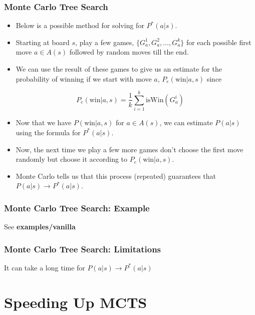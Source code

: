 \documentclass{beamer}
\begin{document}
\begin{frame}
  \frametitle{Monte Carlo Tree Search}
  \begin{itemize}
  \item Below is a possible method for solving for $P^*(a | s)$.
    \pause
  \item Starting at board $s$, play a few games, $\{G_a^1, G_a^2, \dots, G_a^k\}$ for each possible first move $a \in A(s)$ followed by random moves till the end.
  \pause
  \item We can use the result of these games to give us an estimate for the probability of winning if we start with move $a$, $P_e(\text{win} | a, s)$ since
  \end{itemize}
  \pause
  \begin{displaymath}
    P_e(\text{win} | a, s) = \frac{1}{k}\sum_{i=1}^k \text{isWin}(G_a^i)
  \end{displaymath}
  \begin{itemize}
  \item Now that we have $P(\text{win} | a, s)$ for $a \in A(s)$, we can estimate $P(a | s)$ using the formula for $P^*(a | s)$.
    \pause
  \item Now, the next time we play a few more games don't choose the first move randomly but choose it according to $P_e(\text{win} | a, s)$.
    \pause
  \item Monte Carlo tells us that this process (repeated) guarantees that $P(a | s) \longrightarrow P^*(a | s)$.
  \end{itemize}
\end{frame}

\begin{frame}
  \frametitle{Monte Carlo Tree Search: Example}
  \begin{center}
    See \textbf{examples/vanilla}
  \end{center}
\end{frame}

\begin{frame}
  \frametitle{Monte Carlo Tree Search: Limitations}
  \begin{center}
    It can take a long time for $P(a | s) \longrightarrow P^*(a | s)$
  \end{center}
\end{frame}

\section{Speeding Up MCTS}
\end{document}
